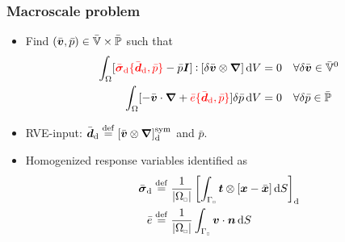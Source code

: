 \documentclass[11pt]{beamer} %
\newcommand{\highlight}[1]{{\color{red}#1}}
\renewcommand{\dev}{\mathrm{d}}
\newcommand{\volume}{|\Omega_\rve|}
\newcommand{\rve}{
  {\mathchoice
   {\mbox{\scalebox{0.67}{$\Box$}}}
   {\mbox{\scalebox{0.67}{$\Box$}}}
   {\mbox{\scalebox{0.5}{$\Box$}}}
   {\mbox{\scalebox{0.375}{$\Box$}}}
  }
}
\begin{document}
\begin{frame}
 \frametitle{Macroscale problem}
\begin{itemize}
 \item Find $(\bar{\boldsymbol{v}}, \bar{p}) \in \bar{\mathbb{V}}\times\bar{\mathbb{P}}$ such that
 \begin{align*}
  \int_\Omega [\highlight{\bar{\ts\sigma}_\dev\{\bar{\ts d}_\dev, \bar{p}\}} - \bar{p}\ts I]\dprod[\delta\bar{\ta v}\outerp\diff]\dif V &= 0\quad \forall \delta\bar{\ta v} \in \bar{\set{V}}^0
\\
  \int_\Omega [-\bar{\ta v}\cdot\diff + \highlight{\bar{e}\{\bar{\ts d}_\dev, \bar{p}\}}]\delta\bar{p}\dif V &= 0\quad \forall \delta\bar{p} \in \bar{\set{P}}
 \end{align*}
 \item RVE-input: $\bar{\ts d}_\dev\defeq [\bar{\ta v}\outerp\diff]^\sym_\dev$ and $\bar{p}$.
 \item Homogenized response variables identified as
 \begin{align*}
 \bar{\ts\sigma}_\dev &\defeq \frac{1}{\volume} \left[\int_{\Gamma_\rve} \ta t \outerp [\ta x-\bar{\ta x}]\dif S\right]_\dev
\\
 \bar{e} &\defeq \frac{1}{\volume} \int_{\Gamma_\rve} \ta v \cdot \ta n\dif S
 \end{align*}
\end{itemize}
\end{frame}
\end{document}
